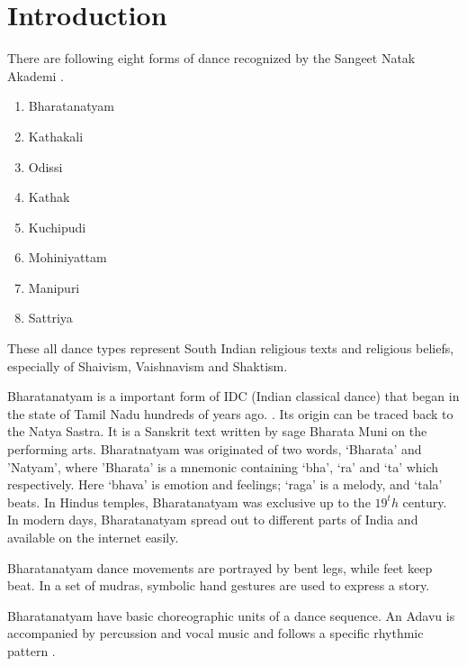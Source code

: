 

\chapter{Introduction} %

\label{Chapter 1} 


There are following eight forms of dance recognized by the Sangeet Natak Akademi \citep{wiki:004}.

\begin{enumerate}
    \item Bharatanatyam
    \item Kathakali
    \item Odissi
    \item Kathak
    \item Kuchipudi
    \item Mohiniyattam
    \item Manipuri
    \item Sattriya
\end{enumerate}

These all dance types represent South Indian religious texts and religious beliefs, especially of Shaivism, Vaishnavism and Shaktism. \citep{williams2004shadow}

Bharatanatyam is a important form of IDC (Indian classical dance) that began in the state of Tamil Nadu hundreds of years ago. \citep{williams2004shadow}. Its origin can be traced back to the Natya Sastra. It is a Sanskrit text written by sage Bharata Muni on the performing arts. Bharatnatyam  was originated of two words, ‘Bharata’ and ’Natyam’, where 'Bharata' is a mnemonic containing ‘bha’, ‘ra’ and ‘ta’ which respectively.
Here ‘bhava’ is emotion and feelings; ‘raga’ is a melody, and ‘tala’ beats.
In Hindus temples, Bharatanatyam was exclusive up to the $19^th$ century. In modern days, Bharatanatyam spread out to different parts of India and available on the internet easily.
 
 Bharatanatyam dance movements are portrayed by bent legs, while feet keep beat. In a set of mudras, symbolic hand gestures are used to express a story.
 
 Bharatanatyam have basic choreographic units of a dance sequence. An Adavu is accompanied by percussion and vocal music and follows a specific rhythmic pattern \citep{mallick2018characterization}.

